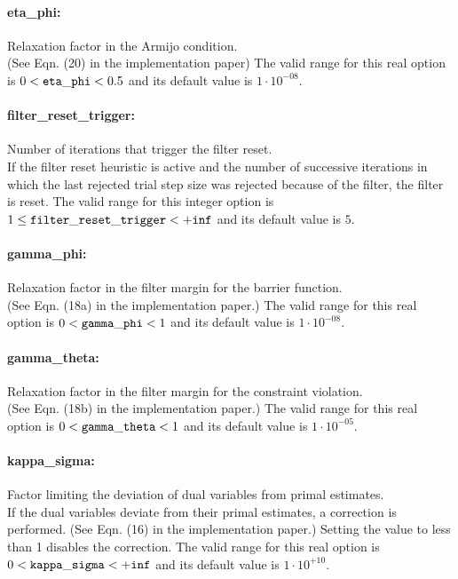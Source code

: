 \paragraph{eta\_phi:}\label{sec:eta_phi} Relaxation factor in the Armijo condition. $\;$ \\
 (See Eqn. (20) in the implementation paper) The valid range for this real option is 
$0 <  {\tt eta\_phi } <  0.5$
and its default value is $1 \cdot 10^{-08}$.


\paragraph{filter\_reset\_trigger:}\label{sec:filter_reset_trigger} Number of iterations that trigger the filter reset. $\;$ \\
 If the filter reset heuristic is active and the
number of successive iterations in which the last
rejected trial step size was rejected because of
the filter, the filter is reset. The valid range for this integer option is
$1 \le {\tt filter\_reset\_trigger } <  {\tt +inf}$
and its default value is $5$.


\paragraph{gamma\_phi:}\label{sec:gamma_phi} Relaxation factor in the filter margin for the barrier function. $\;$ \\
 (See Eqn. (18a) in the implementation paper.) The valid range for this real option is 
$0 <  {\tt gamma\_phi } <  1$
and its default value is $1 \cdot 10^{-08}$.


\paragraph{gamma\_theta:}\label{sec:gamma_theta} Relaxation factor in the filter margin for the constraint violation. $\;$ \\
 (See Eqn. (18b) in the implementation paper.) The valid range for this real option is 
$0 <  {\tt gamma\_theta } <  1$
and its default value is $1 \cdot 10^{-05}$.


\paragraph{kappa\_sigma:}\label{sec:kappa_sigma} Factor limiting the deviation of dual variables from primal estimates. $\;$ \\
 If the dual variables deviate from their primal
estimates, a correction is performed. (See Eqn.
(16) in the implementation paper.) Setting the
value to less than 1 disables the correction. The valid range for this real option is 
$0 <  {\tt kappa\_sigma } <  {\tt +inf}$
and its default value is $1 \cdot 10^{+10}$.


